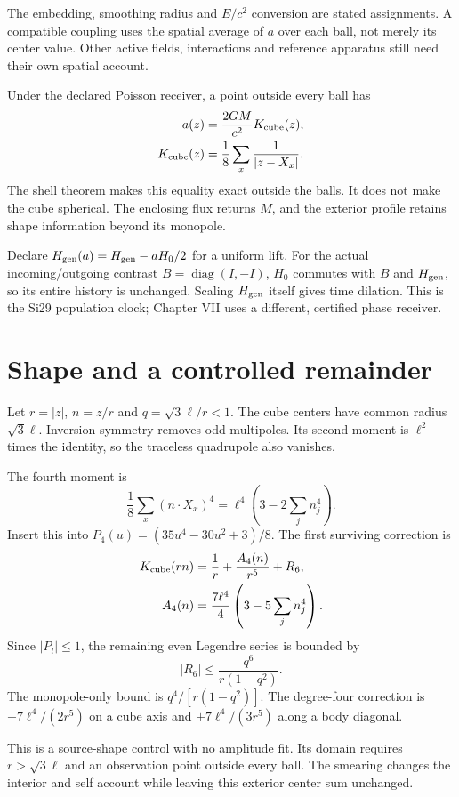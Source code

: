 \documentclass[10pt,twocolumn,letterpaper]{article}
\begin{document}
The embedding, smoothing radius and $E/c^2$ conversion are stated assignments. A compatible coupling uses the spatial average of $a$ over each ball, not merely its center value. Other active fields, interactions and reference apparatus still need their own spatial account.

Under the declared Poisson receiver, a point outside every ball has
\[
\begin{aligned}
a(z)&=\frac{2GM}{c^2}K_{\rm cube}(z),\\
K_{\rm cube}(z)&=\frac18\sum_x\frac1{|z-X_x|}.
\end{aligned}
\]
The shell theorem makes this equality exact outside the balls. It does not make the cube spherical. The enclosing flux returns $M$, and the exterior profile retains shape information beyond its monopole.

Declare $H_{\rm gen}(a)=H_{\rm gen}-aH_0/2$ for a uniform lift. For the actual incoming/outgoing contrast $B=\operatorname{diag}(I,-I)$, $H_0$ commutes with $B$ and $H_{\rm gen}$, so its entire history is unchanged. Scaling $H_{\rm gen}$ itself gives time dilation. This is the Si29 population clock; Chapter VII uses a different, certified phase receiver.

\section{Shape and a controlled remainder}
Let $r=|z|$, $n=z/r$ and $q=\sqrt3\ell/r<1$. The cube centers have common radius $\sqrt3\ell$. Inversion symmetry removes odd multipoles. Its second moment is $\ell^2$ times the identity, so the traceless quadrupole also vanishes.

The fourth moment is
\[
\frac18\sum_x(n\cdot X_x)^4=\ell^4\left(3-2\sum_j n_j^4\right).
\]
Insert this into $P_4(u)=(35u^4-30u^2+3)/8$. The first surviving correction is
\[
\begin{aligned}
K_{\rm cube}(rn)&=\frac1r+\frac{A_4(n)}{r^5}+R_6,\\
A_4(n)&=\frac{7\ell^4}{4}\left(3-5\sum_j n_j^4\right).
\end{aligned}
\]
Since $|P_l|\leq1$, the remaining even Legendre series is bounded by
\[
|R_6|\leq\frac{q^6}{r(1-q^2)}.
\]
The monopole-only bound is $q^4/[r(1-q^2)]$. The degree-four correction is $-7\ell^4/(2r^5)$ on a cube axis and $+7\ell^4/(3r^5)$ along a body diagonal.

This is a source-shape control with no amplitude fit. Its domain requires $r>\sqrt3\ell$ and an observation point outside every ball. The smearing changes the interior and self account while leaving this exterior center sum unchanged.
\end{document}
